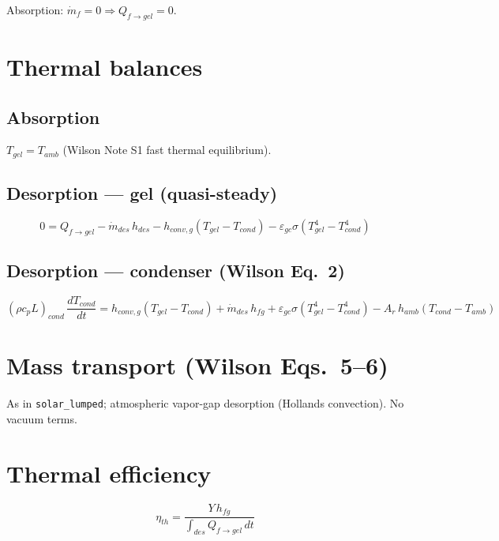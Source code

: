 \documentclass[11pt]{article}
\begin{document}
Absorption: $\dot{m}_f = 0 \Rightarrow Q_{f \to gel} = 0$.

\section{Thermal balances}

\subsection{Absorption}
$T_{gel} = T_{amb}$ (Wilson Note S1 fast thermal equilibrium).

\subsection{Desorption --- gel (quasi-steady)}
\[
0 = Q_{f \to gel} - \dot{m}_{des}\, h_{des}
- h_{conv,g}(T_{gel} - T_{cond}) - \varepsilon_{gc}\sigma(T_{gel}^4 - T_{cond}^4)
\]

\subsection{Desorption --- condenser (Wilson Eq.~2)}
\[
(\rho c_p L)_{cond}\,\frac{dT_{cond}}{dt}
= h_{conv,g}(T_{gel} - T_{cond}) + \dot{m}_{des}\, h_{fg}
+ \varepsilon_{gc}\sigma(T_{gel}^4 - T_{cond}^4)
- A_r\, h_{amb}(T_{cond} - T_{amb})
\]

\section{Mass transport (Wilson Eqs.~5--6)}

As in \texttt{solar\_lumped}; atmospheric vapor-gap desorption (Hollands convection). No vacuum terms.

\section{Thermal efficiency}

\[
\eta_{th} = \frac{Y\, h_{fg}}{\int_{des} Q_{f \to gel}\, dt}
\]
\end{document}
